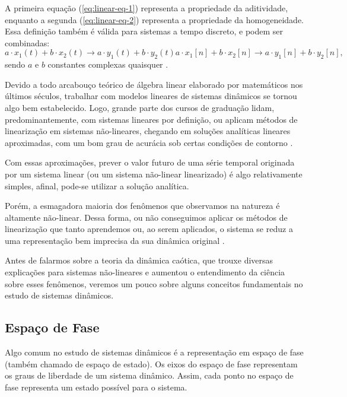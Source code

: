 \documentclass[a4paper, 12pt]{article}
\begin{document}
A primeira equação (\ref{eq:linear-eq-1}) representa a propriedade da aditividade, enquanto a segunda (\ref{eq:linear-eq-2}) representa a propriedade da homogeneidade. Essa definição também é válida para sistemas a tempo discreto, e podem ser combinadas:
\begin{subequations}
\begin{equation}
a \cdot x_1(t) + b \cdot x_2(t) \rightarrow a \cdot y_1(t) + b \cdot y_2(t)
\end{equation}
\begin{equation}
a \cdot x_1[n] + b \cdot x_2[n] \rightarrow a \cdot y_1[n] + b \cdot y_2[n]\mathtt{,}
\end{equation}
\end{subequations}
sendo $a$ e $b$ constantes complexas quaisquer \cite{oppenheim2014signals}.

Devido a todo arcabouço teórico de álgebra linear elaborado por matemáticos nos últimos séculos, trabalhar com modelos lineares de sistemas dinâmicos se tornou algo bem estabelecido. Logo, grande parte dos cursos de graduação lidam,  predominantemente, com sistemas lineares por definição, ou aplicam métodos de linearização em sistemas não-lineares, chegando em soluções analíticas lineares aproximadas, com um bom grau de acurácia sob certas condições de contorno \cite{fiedler1994caos}. 

Com essas aproximações, prever o valor futuro de uma série temporal originada por um sistema linear (ou um sistema não-linear linearizado) é algo relativamente simples, afinal, pode-se utilizar a solução analítica.

Porém, a esmagadora maioria dos fenômenos que observamos na natureza é altamente não-linear. Dessa forma, ou não conseguimos aplicar os métodos de linearização que tanto aprendemos ou, ao serem aplicados, o sistema se reduz a uma representação bem imprecisa da sua dinâmica original \cite{gleick1998chaos}.

Antes de falarmos sobre a teoria da dinâmica caótica, que trouxe diversas explicações para sistemas não-lineares e aumentou o entendimento da ciência sobre esses fenômenos, veremos um pouco sobre alguns conceitos fundamentais no estudo de sistemas dinâmicos.

\subsection{Espaço de Fase}
Algo comum no estudo de sistemas dinâmicos é a representação em espaço de fase (também chamado de espaço de estado). Os eixos do espaço de fase representam os graus de liberdade de um sistema dinâmico. Assim, cada ponto no espaço de fase representa um estado possível para o sistema.
\end{document}
